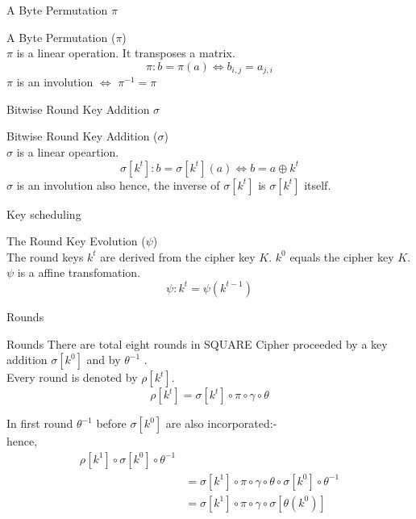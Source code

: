 \begin{frame}{A Byte Permutation $\pi$}
    \begin{beamerboxesrounded}{A Byte Permutation ($\pi$)}\\
        $\pi$ is a linear operation. It transposes a matrix.
        $$
        \pi: b=\pi(a) \Leftrightarrow b_{i, j}=a_{j, i}
        $$
        $\pi$ is an involution $\iff$ $\pi^{-1}=\pi$
    \end{beamerboxesrounded}
\end{frame}

\begin{frame}{Bitwise Round Key Addition $\sigma$}
    \begin{beamerboxesrounded}{Bitwise Round Key Addition ($\sigma$)}\\
        $\sigma$ is a linear opeartion.\\
        $$
        \sigma\left[k^{t}\right]: b=\sigma\left[k^{t}\right](a) \Leftrightarrow b=a \oplus k^{t}
        $$
        $\sigma$ is an involution also hence,
        the inverse of $\sigma\left[k^{t}\right]$ is $\sigma\left[k^{t}\right]$ itself.
    \end{beamerboxesrounded}             
\end{frame}

\begin{frame}{Key scheduling}
    \begin{beamerboxesrounded}{The Round Key Evolution ($\psi$)}\\
        The round keys $k^{t}$ are derived from the cipher key $K$. $k^{0}$ equals the cipher key $K$.$\psi$ is a affine transfomation.
        $$
        \psi: k^{t}=\psi\left(k^{t-1}\right)
        $$  
    \end{beamerboxesrounded}
\end{frame}

\begin{frame}{Rounds}
    \begin{beamerboxesrounded}{Rounds}
        There are total eight rounds in SQUARE Cipher proceeded by a key addition $\sigma\left[k^{0}\right]$ and by $\theta^{-1}$ .\\
        Every round is denoted by $\rho\left[k^{t}\right]$.
        $$
        \rho\left[k^{t}\right]=\sigma\left[k^{t}\right] \circ \pi \circ \gamma \circ \theta
        $$
        
        In first round $\theta^{-1}$ before $\sigma\left[k^{0}\right]$ are also incorporated:-\\
        hence,
        $$
        \begin{aligned}
        \rho\left[k^{1}\right] \circ \sigma\left[k^{0}\right] \circ \theta^{-1}\\ &=\sigma\left[k^{1}\right] \circ \pi \circ \gamma \circ \theta \circ \sigma\left[k^{0}\right] \circ \theta^{-1} \\
        &=\sigma\left[k^{1}\right] \circ \pi \circ \gamma \circ \sigma\left[\theta\left(k^{0}\right)\right]
        \end{aligned}
        $$
    \end{beamerboxesrounded}
\end{frame}

